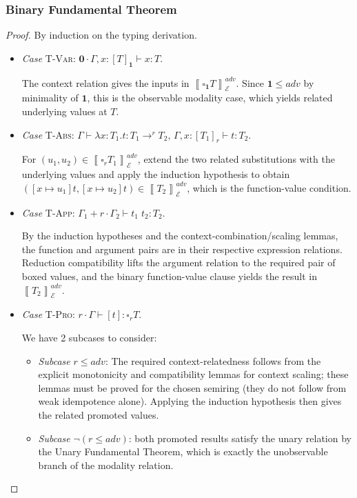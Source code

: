 \documentclass[conference]{IEEEtran}
\newcommand\lam[2]{\lambda #1.#2}
\newcommand\gradedt[2]{\square_{#1} #2}
\newcommand\srzero{\textbf{0}}
\newcommand\srone{\textbf{1}}
\newcommand\cale{\mathcal{E}}
\newcommand\bbrac[1]{\left\llbracket #1\right\rrbracket}
\begin{document}
\subsubsection{Binary Fundamental Theorem}

\begin{proof}
	By induction on the typing derivation.
	\begin{itemize}
        \item \emph{Case} \textsc{T-Var}: $\srzero\cdot\Gamma,x:[T]_\srone\vdash x:T$.
        
        The context relation gives the inputs in $\bbrac{\gradedt{\srone}{T}}^{adv}_\cale$. Since $\srone\le adv$ by minimality of $\srone$, this is the observable modality case, which yields related underlying values at $T$.
        
        \item \emph{Case} \textsc{T-Abs}: $\Gamma\vdash\lam{x:T_1}{t}:T_1\to^r T_2$, $\Gamma,x:[T_1]_r\vdash t:T_2$.
        
        For $(u_1,u_2)\in\bbrac{\gradedt{r}{T_1}}^{adv}_\cale$, extend the two related substitutions with the underlying values and apply the induction hypothesis to obtain $([x\mapsto u_1]t,[x\mapsto u_2]t)\in\bbrac{T_2}^{adv}_\cale$, which is the function-value condition.
        
        \item \emph{Case} \textsc{T-App}: $\Gamma_1+r\cdot\Gamma_2\vdash t_1\; t_2:T_2$.
        
        By the induction hypotheses and the context-combination/scaling lemmas, the function and argument pairs are in their respective expression relations. Reduction compatibility lifts the argument relation to the required pair of boxed values, and the binary function-value clause yields the result in $\bbrac{T_2}^{adv}_\cale$.
        
        \item \emph{Case} \textsc{T-Pro}: $r\cdot\Gamma\vdash [t]:\gradedt{r}{T}$.
        
        We have 2 subcases to consider:
        \begin{itemize}
            \item \emph{Subcase} $r\le adv$: The required context-relatedness follows from the explicit monotonicity and compatibility lemmas for context scaling; these lemmas must be proved for the chosen semiring (they do not follow from weak idempotence alone). Applying the induction hypothesis then gives the related promoted values.
            \item \emph{Subcase} $\neg(r\le adv)$: both promoted results satisfy the unary relation by the Unary Fundamental Theorem, which is exactly the unobservable branch of the modality relation.
        \end{itemize}
        

\end{itemize}
\end{proof}
\end{document}
